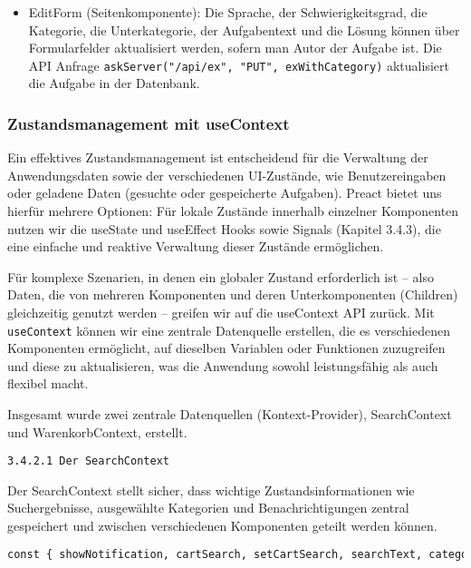 \begin{itemize}
\item{EditForm} (Seitenkomponente):
Die Sprache, der Schwierigkeitsgrad, die Kategorie, die Unterkategorie, der Aufgabentext und die Lösung können über Formularfelder aktualisiert werden, sofern man Autor der Aufgabe ist.
Die API Anfrage \texttt{askServer("/api/ex", "PUT", exWithCategory)} aktualisiert die Aufgabe in der Datenbank.


\end{itemize}




\subsubsection{Zustandsmanagement mit useContext } 

Ein effektives Zustandsmanagement ist entscheidend für die Verwaltung der Anwendungsdaten sowie der verschiedenen UI-Zustände, wie Benutzereingaben oder geladene Daten (gesuchte oder gespeicherte Aufgaben). Preact bietet uns hierfür mehrere Optionen: Für lokale Zustände innerhalb einzelner Komponenten nutzen wir die useState und useEffect Hooks sowie Signals (Kapitel 3.4.3), die eine einfache und reaktive Verwaltung dieser Zustände ermöglichen. 

Für komplexe Szenarien, in denen ein globaler Zustand erforderlich ist – also Daten, die von mehreren Komponenten und deren Unterkomponenten (Children) gleichzeitig genutzt werden – greifen wir auf die useContext API zurück. Mit \texttt{useContext} können wir eine zentrale Datenquelle erstellen, die es verschiedenen Komponenten ermöglicht, auf dieselben Variablen oder Funktionen zuzugreifen und diese zu aktualisieren, was die Anwendung sowohl leistungsfähig als auch flexibel macht.

Insgesamt wurde zwei zentrale Datenquellen (Kontext-Provider), SearchContext und WarenkorbContext, erstellt. 

\texttt{3.4.2.1 Der SearchContext}

Der SearchContext stellt sicher, dass wichtige Zustandsinformationen wie Suchergebnisse, ausgewählte Kategorien und Benachrichtigungen zentral gespeichert und zwischen verschiedenen Komponenten geteilt werden können. 


\begin{lstlisting}[language=Python]
const { showNotification, cartSearch, setCartSearch, searchText, categor, deleteCard } = useContext(SearchContext);
 \end{lstlisting}  
 
